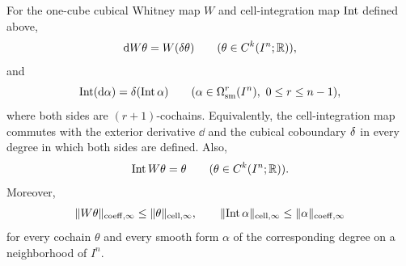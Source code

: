 \begin{proposition}
\label{prop:cubical-whitney}
For the one-cube cubical Whitney map $W$ and cell-integration map $\operatorname{Int}$
defined above,
\[
\mathrm{d} W\theta=W(\delta\theta)
\qquad
(\theta\in C^k(I^n;\mathbb{R})),
\]
and
\[
\operatorname{Int}(\mathrm{d}\alpha)=\delta(\operatorname{Int}\alpha)
\qquad
(\alpha\in\Omega^r_{\mathrm{sm}}(I^n),\ 0\le r\le n-1),
\]
where both sides are $(r+1)$-cochains. Equivalently, the cell-integration map
commutes with the exterior derivative $\dd$ and the cubical coboundary $\delta$ in
every degree in which both sides are defined. Also,
\[
\operatorname{Int} W\theta=\theta
\qquad
(\theta\in C^k(I^n;\mathbb{R})).
\]
Moreover,
\[
\lVert W\theta \rVert_{\mathrm{coeff},\infty}\le\lVert \theta \rVert_{\mathrm{cell},\infty},
\qquad
\lVert \operatorname{Int}\alpha \rVert_{\mathrm{cell},\infty}\le\lVert \alpha \rVert_{\mathrm{coeff},\infty}
\]
for every cochain $\theta$ and every smooth form $\alpha$ of the corresponding
degree on a neighborhood of $I^n$.
\end{proposition}

